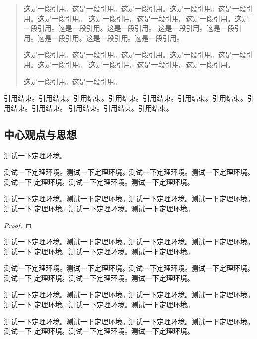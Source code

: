 \begin{quotation}
这是一段引用。这是一段引用。这是一段引用。这是一段引用。这是一段引用。这是一段引用。
这是一段引用。这是一段引用。这是一段引用。这是一段引用。这是一段引用。这是一段引用。
这是一段引用。这是一段引用。这是一段引用。这是一段引用。这是一段引用。

这是一段引用。这是一段引用。这是一段引用。这是一段引用。这是一段引用。这是一段引用。
这是一段引用。这是一段引用。这是一段引用。

这是一段引用。这是一段引用。
\end{quotation}

引用结束。引用结束。引用结束。引用结束。引用结束。引用结束。引用结束。引用结束。引用结束。
引用结束。引用结束。引用结束。



\subsection{中心观点与思想}


测试一下定理环境。

\begin{theorem}[测试定理]
测试一下定理环境。测试一下定理环境。测试一下定理环境。测试一下定理环境。测试一下
定理环境。测试一下定理环境。测试一下定理环境。
\end{theorem}

\begin{lemma}
测试一下定理环境。测试一下定理环境。测试一下定理环境。测试一下定理环境。测试一下
定理环境。测试一下定理环境。测试一下定理环境。
\end{lemma}
\begin{proof}

\end{proof}
测试一下定理环境。测试一下定理环境。测试一下定理环境。测试一下定理环境。测试一下
定理环境。测试一下定理环境。测试一下定理环境。
\begin{definition}
测试一下定理环境。测试一下定理环境。测试一下定理环境。测试一下定理环境。测试一下
定理环境。测试一下定理环境。测试一下定理环境。
\end{definition}

\begin{corollary}
测试一下定理环境。测试一下定理环境。测试一下定理环境。测试一下定理环境。测试一下
定理环境。测试一下定理环境。测试一下定理环境。
\end{corollary}

\begin{proposition}
测试一下定理环境。测试一下定理环境。测试一下定理环境。测试一下定理环境。测试一下
定理环境。测试一下定理环境。测试一下定理环境。
\end{proposition}


